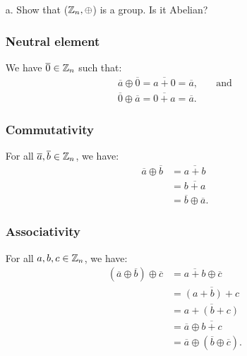 \documentclass[11pt]{article}
\newcommand{\cls}[1]{\overline{#1}}
\begin{document}
\begin{enumerate}
    \item[a.] Show that ($\mathbb{Z}_n, \oplus$) is a group. Is it Abelian?

          \subsubsection*{Neutral element}

          We have $\cls{0} \in \Z_n$ such that:
          \[
              \begin{aligned}
                  \cls{a} \oplus \cls{0} = \cls{a + 0} = \cls{a}, & \quad \textrm{and} \\
                  \cls{0} \oplus \cls{a} = \cls{0 + a} = \cls{a}.
              \end{aligned}
          \]

          \subsubsection*{Commutativity}

          For all $\cls{a}, \cls{b} \in \Z_n$, we have:
          \[
              \begin{aligned}
                  \cls{a} \oplus \cls{b} & = \cls{a + b}             \\
                                         & = \cls{b + a}             \\
                                         & = \cls{b} \oplus \cls{a}.
              \end{aligned}
          \]

          \subsubsection*{Associativity}

          For all $a, b, c \in \mathbb{Z}_n$, we have:
          \[
              \begin{aligned}
                  (\cls{a} \oplus \cls{b}) \oplus \cls{c} & = \cls{a + b} \oplus \cls{c}               \\
                                                          & = \cls{(a + b) + c}                        \\
                                                          & = \cls{a + (b + c)}                        \\
                                                          & = \cls{a} \oplus \cls{b + c}               \\
                                                          & = \cls{a} \oplus (\cls{b} \oplus \cls{c}).
              \end{aligned}
          \]


\end{enumerate}
\end{document}
